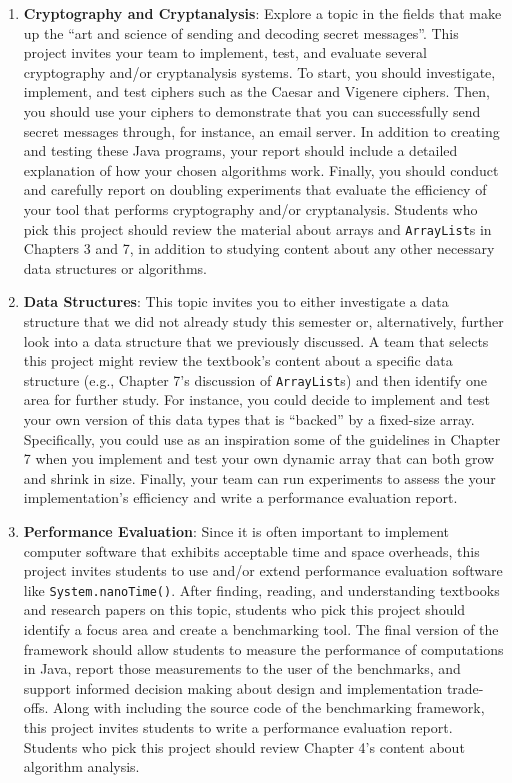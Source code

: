 \documentclass[11pt]{article}
\newcommand{\program}[1]{\lstinline{#1}}
\begin{document}
\begin{enumerate}

  \item {\bf Cryptography and Cryptanalysis}: Explore a topic in the fields that
    make up the ``art and science of sending and decoding secret messages''.
    This project invites your team to implement, test, and evaluate several
    cryptography and/or cryptanalysis systems. To start, you should investigate,
    implement, and test ciphers such as the Caesar and Vigenere ciphers. Then,
    you should use your ciphers to demonstrate that you can successfully send
    secret messages through, for instance, an email server. In addition to
    creating and testing these Java programs, your report should include a
    detailed explanation of how your chosen algorithms work. Finally, you should
    conduct and carefully report on doubling experiments that evaluate the
    efficiency of your tool that performs cryptography and/or cryptanalysis.
    Students who pick this project should review the material about arrays and
    \program{ArrayList}s in Chapters 3 and 7, in addition to studying content
    about any other necessary data structures or algorithms.

  \item {\bf Data Structures}: This topic invites you to either investigate a
    data structure that we did not already study this semester or,
    alternatively, further look into a data structure that we previously
    discussed. A team that selects this project might review the textbook's
    content about a specific data structure (e.g., Chapter 7's discussion of
    \program{ArrayList}s) and then identify one area for further study. For
    instance, you could decide to implement and test your own version of this
    data types that is ``backed'' by a fixed-size array. Specifically, you could
    use as an inspiration some of the guidelines in Chapter 7 when you implement
    and test your own dynamic array that can both grow and shrink in size.
    Finally, your team can run experiments to assess the your implementation's
    efficiency and write a performance evaluation report.

  \item {\bf Performance Evaluation}: Since it is often important to implement
    computer software that exhibits acceptable time and space overheads, this
    project invites students to use and/or extend performance evaluation
    software like \program{System.nanoTime()}. After finding, reading, and
    understanding textbooks and research papers on this topic, students who pick
    this project should identify a focus area and create a benchmarking tool.
    The final version of the framework should allow students to measure the
    performance of computations in Java, report those measurements to the user
    of the benchmarks, and support informed decision making about design and
    implementation trade-offs. Along with including the source code of the
    benchmarking framework, this project invites students to write a performance
    evaluation report. Students who pick this project should review Chapter 4's
    content about algorithm analysis.


\end{enumerate}
\end{document}
